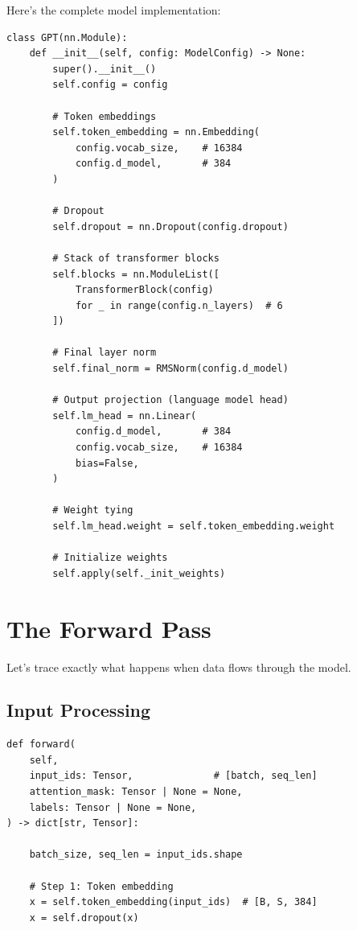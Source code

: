 Here's the complete model implementation:

\begin{lstlisting}[style=python, caption={GPT model from model.py}]
class GPT(nn.Module):
    def __init__(self, config: ModelConfig) -> None:
        super().__init__()
        self.config = config

        # Token embeddings
        self.token_embedding = nn.Embedding(
            config.vocab_size,    # 16384
            config.d_model,       # 384
        )

        # Dropout
        self.dropout = nn.Dropout(config.dropout)

        # Stack of transformer blocks
        self.blocks = nn.ModuleList([
            TransformerBlock(config)
            for _ in range(config.n_layers)  # 6
        ])

        # Final layer norm
        self.final_norm = RMSNorm(config.d_model)

        # Output projection (language model head)
        self.lm_head = nn.Linear(
            config.d_model,       # 384
            config.vocab_size,    # 16384
            bias=False,
        )

        # Weight tying
        self.lm_head.weight = self.token_embedding.weight

        # Initialize weights
        self.apply(self._init_weights)
\end{lstlisting}

\section{The Forward Pass}

Let's trace exactly what happens when data flows through the model.

\subsection{Input Processing}

\begin{lstlisting}[style=python, caption={Forward pass from model.py}]
def forward(
    self,
    input_ids: Tensor,              # [batch, seq_len]
    attention_mask: Tensor | None = None,
    labels: Tensor | None = None,
) -> dict[str, Tensor]:

    batch_size, seq_len = input_ids.shape

    # Step 1: Token embedding
    x = self.token_embedding(input_ids)  # [B, S, 384]
    x = self.dropout(x)
\end{lstlisting}

